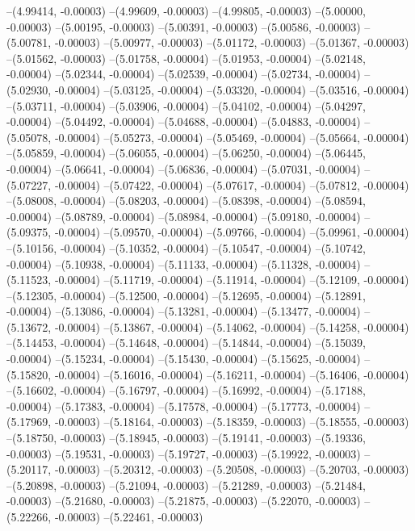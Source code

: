 --(4.99414, -0.00003)
--(4.99609, -0.00003)
--(4.99805, -0.00003)
--(5.00000, -0.00003)
--(5.00195, -0.00003)
--(5.00391, -0.00003)
--(5.00586, -0.00003)
--(5.00781, -0.00003)
--(5.00977, -0.00003)
--(5.01172, -0.00003)
--(5.01367, -0.00003)
--(5.01562, -0.00003)
--(5.01758, -0.00004)
--(5.01953, -0.00004)
--(5.02148, -0.00004)
--(5.02344, -0.00004)
--(5.02539, -0.00004)
--(5.02734, -0.00004)
--(5.02930, -0.00004)
--(5.03125, -0.00004)
--(5.03320, -0.00004)
--(5.03516, -0.00004)
--(5.03711, -0.00004)
--(5.03906, -0.00004)
--(5.04102, -0.00004)
--(5.04297, -0.00004)
--(5.04492, -0.00004)
--(5.04688, -0.00004)
--(5.04883, -0.00004)
--(5.05078, -0.00004)
--(5.05273, -0.00004)
--(5.05469, -0.00004)
--(5.05664, -0.00004)
--(5.05859, -0.00004)
--(5.06055, -0.00004)
--(5.06250, -0.00004)
--(5.06445, -0.00004)
--(5.06641, -0.00004)
--(5.06836, -0.00004)
--(5.07031, -0.00004)
--(5.07227, -0.00004)
--(5.07422, -0.00004)
--(5.07617, -0.00004)
--(5.07812, -0.00004)
--(5.08008, -0.00004)
--(5.08203, -0.00004)
--(5.08398, -0.00004)
--(5.08594, -0.00004)
--(5.08789, -0.00004)
--(5.08984, -0.00004)
--(5.09180, -0.00004)
--(5.09375, -0.00004)
--(5.09570, -0.00004)
--(5.09766, -0.00004)
--(5.09961, -0.00004)
--(5.10156, -0.00004)
--(5.10352, -0.00004)
--(5.10547, -0.00004)
--(5.10742, -0.00004)
--(5.10938, -0.00004)
--(5.11133, -0.00004)
--(5.11328, -0.00004)
--(5.11523, -0.00004)
--(5.11719, -0.00004)
--(5.11914, -0.00004)
--(5.12109, -0.00004)
--(5.12305, -0.00004)
--(5.12500, -0.00004)
--(5.12695, -0.00004)
--(5.12891, -0.00004)
--(5.13086, -0.00004)
--(5.13281, -0.00004)
--(5.13477, -0.00004)
--(5.13672, -0.00004)
--(5.13867, -0.00004)
--(5.14062, -0.00004)
--(5.14258, -0.00004)
--(5.14453, -0.00004)
--(5.14648, -0.00004)
--(5.14844, -0.00004)
--(5.15039, -0.00004)
--(5.15234, -0.00004)
--(5.15430, -0.00004)
--(5.15625, -0.00004)
--(5.15820, -0.00004)
--(5.16016, -0.00004)
--(5.16211, -0.00004)
--(5.16406, -0.00004)
--(5.16602, -0.00004)
--(5.16797, -0.00004)
--(5.16992, -0.00004)
--(5.17188, -0.00004)
--(5.17383, -0.00004)
--(5.17578, -0.00004)
--(5.17773, -0.00004)
--(5.17969, -0.00003)
--(5.18164, -0.00003)
--(5.18359, -0.00003)
--(5.18555, -0.00003)
--(5.18750, -0.00003)
--(5.18945, -0.00003)
--(5.19141, -0.00003)
--(5.19336, -0.00003)
--(5.19531, -0.00003)
--(5.19727, -0.00003)
--(5.19922, -0.00003)
--(5.20117, -0.00003)
--(5.20312, -0.00003)
--(5.20508, -0.00003)
--(5.20703, -0.00003)
--(5.20898, -0.00003)
--(5.21094, -0.00003)
--(5.21289, -0.00003)
--(5.21484, -0.00003)
--(5.21680, -0.00003)
--(5.21875, -0.00003)
--(5.22070, -0.00003)
--(5.22266, -0.00003)
--(5.22461, -0.00003)
